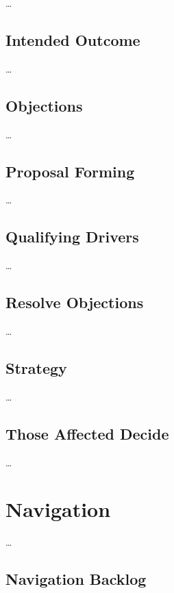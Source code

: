 {\ldots}

\section{Intended Outcome}
\label{intendedoutcome}

{\ldots}

\section{Objections}
\label{objections}

{\ldots}

\section{Proposal Forming}
\label{proposalforming}

{\ldots}

\section{Qualifying Drivers}
\label{qualifyingdrivers}

{\ldots}

\section{Resolve Objections}
\label{resolveobjections}

{\ldots}

\section{Strategy}
\label{strategy}

{\ldots}

\section{Those Affected Decide}
\label{thoseaffecteddecide}

{\ldots}

\chapter{Navigation}
\label{navigation}

{\ldots}

\section{Navigation Backlog}
\label{navigationbacklog}

